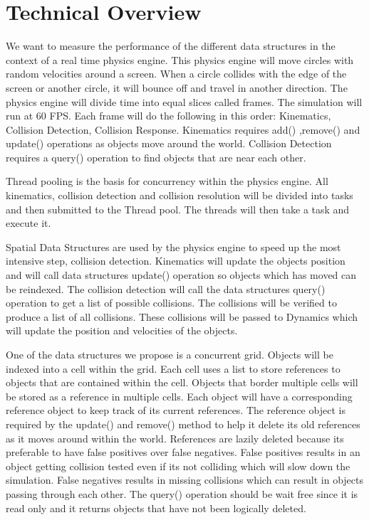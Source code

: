 \documentclass[conference]{IEEEtran}
\begin{document}
\section{Technical Overview}
We want to measure the performance of the different data structures in the context of a real time physics engine. This physics engine will move circles with random velocities around a screen. When a circle collides with the edge of the screen or another circle, it will bounce off and travel in another direction. The physics engine will divide time into equal slices called frames. The simulation will run at 60 FPS. Each frame will do the following in this order: Kinematics, Collision Detection, Collision Response. Kinematics requires add() ,remove() and update() operations as objects move around the world. Collision Detection requires a query() operation to find objects that are near each other.

Thread pooling is the basis for concurrency within the physics engine. All kinematics, collision detection and collision resolution will be divided into tasks and then submitted to the Thread pool. The threads will then take a task and execute it.

Spatial Data Structures are used by the physics engine to speed up the most intensive step, collision detection. Kinematics will update the object\textquotesingle s position and will call data structure\textquotesingle s update() operation so objects which has moved can be reindexed. The collision detection will call the data structure\textquotesingle s query() operation to get a list of possible collisions. The collisions will be verified to produce a list of all collisions. These collisions will be passed to Dynamics which will update the position and velocities of the objects.

One of the data structures we propose is a concurrent grid. Objects will be indexed into a cell within the grid. Each cell uses a list to store references to objects that are contained within the cell. Objects that border multiple cells will be stored as a reference in multiple cells. Each object will have a corresponding reference object to keep track of it\textquotesingle s current references. The reference object is required by the update() and remove() method to help it delete it\textquotesingle s old references as it moves around within the world. References are lazily deleted because it\textquotesingle s preferable to have false positives over false negatives. False positives results in an object getting collision tested even if it\textquotesingle s not colliding which will slow down the simulation. False negatives results in missing collisions which can result in objects passing through each other. The query() operation should be wait free since it is read only and it returns objects that have not been logically deleted.
\end{document}

